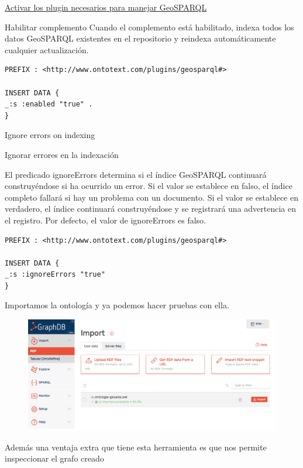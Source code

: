 \underline{Activar los plugin necesarios para manejar GeoSPARQL}


Habilitar complemento
Cuando el complemento está habilitado, indexa todos los datos GeoSPARQL existentes en el repositorio y reindexa automáticamente cualquier actualización.

\begin{lstlisting}
PREFIX : <http://www.ontotext.com/plugins/geosparql#>

INSERT DATA {
_:s :enabled "true" .
}
\end{lstlisting}

Ignore errors on indexing

Ignorar errores en la indexación

El predicado ignoreErrors determina si el índice GeoSPARQL continuará construyéndose si ha ocurrido un error. Si el valor se establece en falso, el índice completo fallará si hay un problema con un documento. Si el valor se establece en verdadero, el índice continuará construyéndose y se registrará una advertencia en el registro. Por defecto, el valor de ignoreErrors es falso.

\begin{lstlisting}
PREFIX : <http://www.ontotext.com/plugins/geosparql#>

INSERT DATA {
_:s :ignoreErrors "true"
}
\end{lstlisting}

Importamos la ontología y ya podemos hacer pruebas con ella.

\begin{figure}[H]
	\centering
	\includegraphics[width=0.7\linewidth]{imagenes/capitulo4/import-owl}
	\caption{}
	\label{fig:import-owl}
\end{figure}

Además una ventaja extra que tiene esta herramienta es que nos permite inspeccionar el grafo creado

